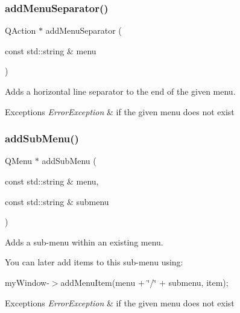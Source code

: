 \subsubsection{\texorpdfstring{add\+Menu\+Separator()}{addMenuSeparator()}}
{\footnotesize\ttfamily Q\+Action $\ast$ add\+Menu\+Separator (\begin{DoxyParamCaption}\item[{const std\+::string \&}]{menu }\end{DoxyParamCaption})\hspace{0.3cm}{\ttfamily [virtual]}}



Adds a horizontal line separator to the end of the given menu. 


\begin{DoxyExceptions}{Exceptions}
{\em Error\+Exception} & if the given menu does not exist \\
\hline
\end{DoxyExceptions}
\mbox{\label{classsgl_1_1GWindow_a557f7b2372831420546b73239027d2ae}} 
\subsubsection{\texorpdfstring{add\+Sub\+Menu()}{addSubMenu()}}
{\footnotesize\ttfamily Q\+Menu $\ast$ add\+Sub\+Menu (\begin{DoxyParamCaption}\item[{const std\+::string \&}]{menu,  }\item[{const std\+::string \&}]{submenu }\end{DoxyParamCaption})\hspace{0.3cm}{\ttfamily [virtual]}}



Adds a sub-\/menu within an existing menu. 

You can later add items to this sub-\/menu using\+:

my\+Window-\/$>$add\+Menu\+Item(menu + \char`\"{}/\char`\"{} + submenu, item); 
\begin{DoxyExceptions}{Exceptions}
{\em Error\+Exception} & if the given menu does not exist \\
\hline
\end{DoxyExceptions}
\mbox{\label{classsgl_1_1GWindow_ab523bda15e486bc3c968059c8b23a8d9}} 
